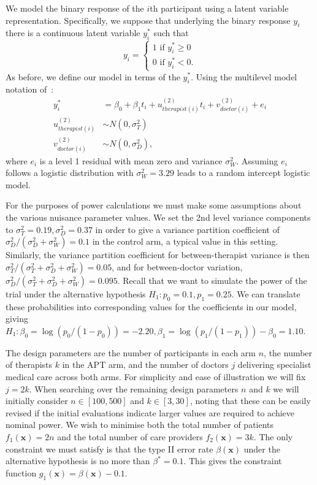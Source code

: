 \documentclass{article}
\begin{document}
We model the binary response of the $i$th participant using a latent variable representation. Specifically, we suppose that underlying the binary response $y_i$ there is a continuous latent variable $y_i^*$ such that
$$
y_i =
\begin{cases}
1 \text{ if } y_i^* \geq 0\\
0 \text{ if } y_i^* < 0.
\end{cases}
$$
As before, we define our model in terms of the $y_i^*$. Using the multilevel model notation of~\cite{Goldstein2003}:
\begin{align}\label{eqn:ex1_model}
y_i^* &= \beta_{0} + \beta_1 t_i + u_{therapist(i)}^{(2)}t_{i} + v_{doctor(i)}^{(2)} + e_i \\
u_{therapist(i)}^{(2)} & \sim N(0, \sigma_T^2) \\
v_{doctor(i)}^{(2)} & \sim N(0, \sigma_D^2),
\end{align}
where $e_i$ is a level 1 residual with mean zero and variance $\sigma_W^2$. Assuming $e_i$ follows a logistic distribution with $\sigma_W^2 = 3.29$ leads to a random intercept logistic model.

For the purposes of power calculations we must make some assumptions about the various nuisance parameter values. We set the 2nd level variance components to $\sigma_{T}^{2} = 0.19, \sigma_{D}^{2} = 0.37$ in order to give a variance partition coefficient of $\sigma_D^2 / (\sigma^2_D + \sigma^2_W) = 0.1$ in the control arm, a typical value in this setting. Similarly, the variance partition coefficient for between-therapist variance is then $\sigma^2_T/(\sigma^2_T + \sigma^2_D + \sigma^2_W) = 0.05$, and for between-doctor variation, $\sigma^2_D/(\sigma^2_T + \sigma^2_D + \sigma^2_W) = 0.095$. Recall that we want to simulate the power of the trial under the alternative hypothesis $H_1: p_0=0.1, p_1=0.25$. We can translate these probabilities into corresponding values for the coefficients in our model, giving $H_1: \beta_0 = \log(p_0/(1-p_0)) = -2.20, \beta_1 = \log(p_1/(1-p_1)) - \beta_0 = 1.10$.

The design parameters are the number of participants in each arm $n$, the number of therapists $k$ in the APT arm, and the number of doctors $j$ delivering specialist medical care across both arms. For simplicity and ease of illustration we will fix $j = 2k$. When searching over the remaining design parameters $n$ and $k$ we will initially consider $n \in [100, 500]$ and $k \in [3, 30]$, noting that these can be easily revised if the initial evaluations indicate larger values are required to achieve nominal power. We wish to minimise both the total number of patients $f_{1}(\mathbf{x}) = 2n$ and the total number of care providers $f_{2}(\mathbf{x}) = 3k$. The only constraint we must satisfy is that the type II error rate $\beta(\mathbf{x})$ under the alternative hypothesis is no more than $\beta^{*} = 0.1$. This gives the constraint function $g_{1}(\mathbf{x}) = \beta(\mathbf{x}) - 0.1$.
\end{document}
